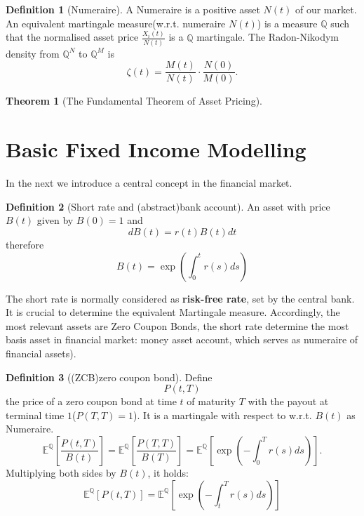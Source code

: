 \documentclass[a4paper,11pt]{book}
\newtheorem{theorem}{Theorem}[section]
\theoremstyle{definition}
\newtheorem{definition}{Definition}[section]
\theoremstyle{remark}
\begin{document}
\begin{definition}[Numeraire]
	A Numeraire is a positive asset $N(t)$ of our market. An equivalent martingale measure(w.r.t. numeraire $N(t)$) is a measure $\mathbb{Q}$ such that the normalised asset price $\frac{X_i(t)}{N(t)}$ is a $\mathbb{Q}$ martingale.
	The Radon-Nikodym density from $\mathbb{Q}^N$ to $\mathbb{Q}^M$ is
\[
\zeta(t) = \frac{M(t)}{N(t)} \cdot \frac{N(0)}{M(0)}.
\]
	
\end{definition}

\begin{theorem}[The Fundamental Theorem of Asset Pricing]
	
\end{theorem}



\section{Basic Fixed Income Modelling}
In the next we introduce a central concept in the financial market. 
\begin{definition}[Short rate and (abstract)bank account]
	An asset with price $B(t)$ given by $B(0) = 1$ and 
	\begin{equation*}
		dB(t) = r(t)B(t)dt
	\end{equation*}
	therefore
	\begin{equation*}
		B(t) = \exp\left(\int_0^t r(s) ds\right)
	\end{equation*}
\end{definition}

The short rate is normally considered as \textbf{risk-free rate}, set by the central bank. It is crucial to determine the equivalent Martingale measure. Accordingly, the most relevant assets are Zero Coupon Bonds, the short rate determine the most basis asset in financial market: money asset account, which serves as numeraire of financial assets).


\begin{definition}[(ZCB)zero coupon bond]
Define 
\begin{equation}
	P(t, T) 
\end{equation}
the price of a zero coupon bond at time $t$ of maturity $T$ with the payout at terminal time $1$($P(T, T) = 1$). It is a martingale with respect to w.r.t. $B(t)$ as Numeraire. 
	\begin{equation*}
		\mathbb{E}^{\mathbb{Q}}[ \frac{P(t, T)}{B(t)}] = \mathbb{E}^\mathbb{Q}\left[\frac{P(T, T)}{B(T)}\right] = \mathbb{E}^\mathbb{Q} \left[\exp(-\int_0^T r(s)ds)\right].
	\end{equation*} 
	Multiplying both sides by $B(t)$, it holds:
	\begin{equation*}
		\mathbb{E}^\mathbb{Q} [P(t, T)] = \mathbb{E}^\mathbb{Q}\left[\exp(-\int_t^T r(s) ds)\right]
	\end{equation*}
\end{definition}
 
\end{document}
